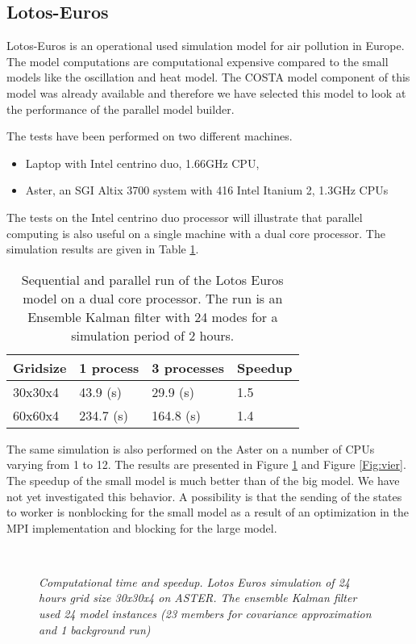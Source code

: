 \subsection{Lotos-Euros}
Lotos-Euros is an operational used simulation model for air pollution in
Europe. The model computations are computational expensive compared to the
small models like the oscillation and heat model. The COSTA model component
of this model was already available and therefore we have selected this
model to look at the performance of the parallel model builder.

The tests have been performed on two different machines.
\begin{itemize}
\item Laptop with Intel centrino duo, 1.66GHz CPU,
\item Aster, an SGI Altix 3700 system with 416 Intel Itanium 2, 1.3GHz CPUs
\end{itemize}

The tests on the Intel centrino duo processor will illustrate that parallel
computing is also useful on a single machine with a dual core processor.
The simulation results are given in Table \ref{Table:Lotos Laptop}. 

\begin{table}[h]
\begin{tabular}{|l|lll|}
\hline
Gridsize & 1 process & 3 processes & Speedup \\
\hline
30x30x4 & 43.9 (s) & 29.9 (s) & 1.5 \\
60x60x4 & 234.7 (s) & 164.8 (s) & 1.4 \\
\hline
\end{tabular}
\caption{Sequential and parallel run of the Lotos Euros model on a
dual core processor. The run is an Ensemble Kalman filter with 24 modes for
a simulation period of 2 hours.}
\label{Table:Lotos Laptop}
\end{table}

The same simulation is also performed on the Aster on a number of CPUs
varying from 1 to 12. The results are presented in Figure \ref{Fig:drie}
and Figure \ref{Fig:vier}. The speedup of the small model is much better
than of the big model. We have not yet investigated this behavior.
A possibility is that the sending of the states to worker is
nonblocking for the small model as a result of an optimization in the MPI
implementation and blocking for the large model.

\begin{figure}
\hbox{
      }

\caption{\em Computational time and speedup. Lotos Euros simulation of 24 
             hours grid size 30x30x4 on ASTER. The ensemble Kalman filter
             used 24 model instances (23 members for covariance approximation
             and 1 background run)}
\label{Fig:drie}
\end{figure}

